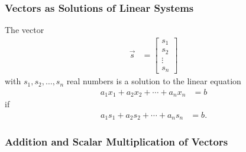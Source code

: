 %
%
%
%

\subsubsection{Vectors as Solutions of Linear Systems}

The vector
%
\begin{align*}
\vec{s} & = \begin{bmatrix}
s_1 \\ s_2 \\ \vdots \\ s_n
\end{bmatrix}
\end{align*} with $s_1, s_2, \ldots, s_n$ real numbers
is a solution to the linear equation
%
\begin{align*}
a_1 x_1 + a_2 x_2 + \cdots + a_n x_n & = b
\end{align*}
if
\begin{align*}
a_1 s_1 + a_2 s_2 + \cdots + a_n s_n & = b.
\end{align*}

\subsubsection{Addition and Scalar Multiplication of Vectors}


